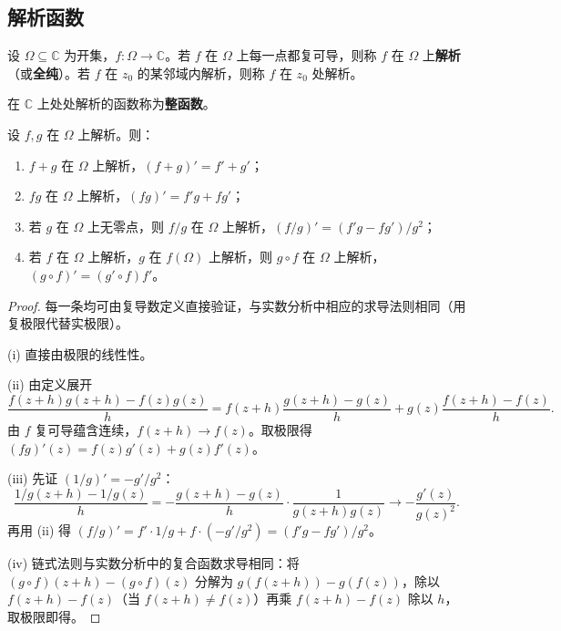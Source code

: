 \subsection{解析函数}

\begin{definition}[解析函数]\label{def:ca_analytic_function}
设 $\Omega \subseteq \mathbb{C}$ 为开集，$f: \Omega \to \mathbb{C}$。若 $f$ 在 $\Omega$ 上每一点都复可导，则称 $f$ 在 $\Omega$ 上\textbf{解析}（或\textbf{全纯}）。若 $f$ 在 $z_0$ 的某邻域内解析，则称 $f$ 在 $z_0$ 处解析。
\end{definition}

\begin{definition}[整函数]\label{def:ca_entire_function}
在 $\mathbb{C}$ 上处处解析的函数称为\textbf{整函数}。
\end{definition}

\begin{proposition}[解析函数的运算性质]\label{prop:ca_analytic_operations}
设 $f, g$ 在 $\Omega$ 上解析。则：
\begin{enumerate}[label=(\roman*)]
    \item $f + g$ 在 $\Omega$ 上解析，$(f+g)' = f' + g'$；
    \item $fg$ 在 $\Omega$ 上解析，$(fg)' = f'g + fg'$；
    \item 若 $g$ 在 $\Omega$ 上无零点，则 $f/g$ 在 $\Omega$ 上解析，$(f/g)' = (f'g - fg')/g^2$；
    \item 若 $f$ 在 $\Omega$ 上解析，$g$ 在 $f(\Omega)$ 上解析，则 $g \circ f$ 在 $\Omega$ 上解析，$(g \circ f)' = (g' \circ f) f'$。
\end{enumerate}
\end{proposition}

\begin{proof}
每一条均可由复导数定义直接验证，与实数分析中相应的求导法则相同（用复极限代替实极限）。

(i) 直接由极限的线性性。

(ii) 由定义展开
\[
\frac{f(z+h)g(z+h) - f(z)g(z)}{h} = f(z+h)\frac{g(z+h)-g(z)}{h} + g(z)\frac{f(z+h)-f(z)}{h}.
\]
由 $f$ 复可导蕴含连续，$f(z+h) \to f(z)$。取极限得 $(fg)'(z) = f(z)g'(z) + g(z)f'(z)$。

(iii) 先证 $(1/g)' = -g'/g^2$：
\[
\frac{1/g(z+h) - 1/g(z)}{h} = -\frac{g(z+h)-g(z)}{h} \cdot \frac{1}{g(z+h)g(z)} \to -\frac{g'(z)}{g(z)^2}.
\]
再用 (ii) 得 $(f/g)' = f' \cdot 1/g + f \cdot (-g'/g^2) = (f'g - fg')/g^2$。

(iv) 链式法则与实数分析中的复合函数求导相同：将 $(g \circ f)(z+h) - (g \circ f)(z)$ 分解为 $g(f(z+h)) - g(f(z))$，除以 $f(z+h) - f(z)$（当 $f(z+h) \neq f(z)$）再乘 $f(z+h) - f(z)$ 除以 $h$，取极限即得。
\end{proof}

